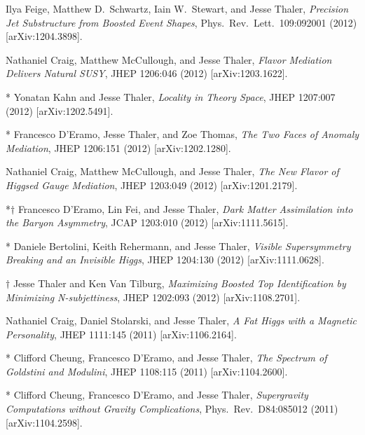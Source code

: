 \begin{list}{[]\addtocounter{jessecount}{-1}}{\leftmargin=3em \itemsep=4pt}
\item
 Ilya Feige, Matthew D.\ Schwartz, Iain W.\ Stewart, and Jesse Thaler,
\emph{Precision Jet Substructure from Boosted Event Shapes},
Phys.\ Rev.\ Lett.\ 109:092001 (2012)
[arXiv:1204.3898].

\item
 Nathaniel Craig, Matthew McCullough, and Jesse Thaler,
\emph{Flavor Mediation Delivers Natural SUSY},
JHEP 1206:046 (2012)
[arXiv:1203.1622].

\item
* Yonatan Kahn and Jesse Thaler,
\emph{Locality in Theory Space},
JHEP 1207:007 (2012)
[arXiv:1202.5491].

\item
* Francesco D'Eramo, Jesse Thaler, and Zoe Thomas,
\emph{The Two Faces of Anomaly Mediation},
JHEP 1206:151 (2012)
[arXiv:1202.1280].

\item
 Nathaniel Craig, Matthew McCullough, and Jesse Thaler,
\emph{The New Flavor of Higgsed Gauge Mediation},
JHEP 1203:049 (2012)
[arXiv:1201.2179].

\item
*$\dagger$ Francesco D'Eramo, Lin Fei, and Jesse Thaler,
\emph{Dark Matter Assimilation into the Baryon Asymmetry},
JCAP 1203:010 (2012)
[arXiv:1111.5615].

\item
* Daniele Bertolini, Keith Rehermann, and Jesse Thaler,
\emph{Visible Supersymmetry Breaking and an Invisible Higgs},
JHEP 1204:130 (2012)
[arXiv:1111.0628].

\item
$\dagger$ Jesse Thaler and Ken Van Tilburg,
\emph{Maximizing Boosted Top Identification by Minimizing N-subjettiness},
JHEP 1202:093 (2012)
[arXiv:1108.2701].

\item
 Nathaniel Craig, Daniel Stolarski, and Jesse Thaler,
\emph{A Fat Higgs with a Magnetic Personality},
JHEP 1111:145 (2011)
[arXiv:1106.2164].

\item
* Clifford Cheung, Francesco D'Eramo, and Jesse Thaler,
\emph{The Spectrum of Goldstini and Modulini},
JHEP 1108:115 (2011)
[arXiv:1104.2600].

\item
* Clifford Cheung, Francesco D'Eramo, and Jesse Thaler,
\emph{Supergravity Computations without Gravity Complications},
Phys.\ Rev.\ D84:085012 (2011)
[arXiv:1104.2598].


\end{list}
